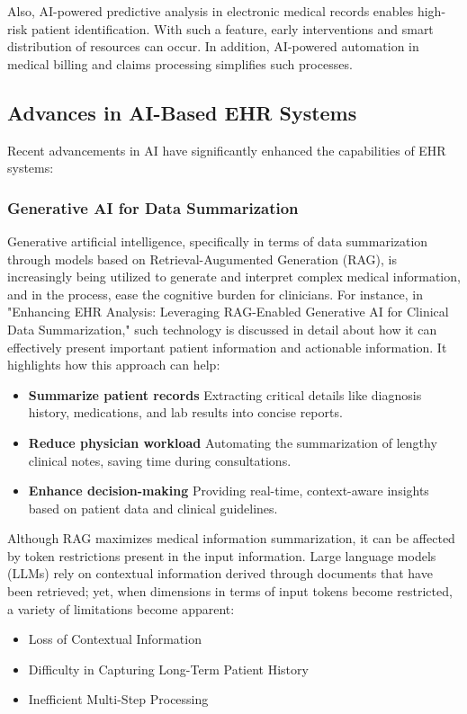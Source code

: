 Also, AI-powered predictive analysis in electronic medical records enables high-risk patient identification. With such a feature, early interventions and smart distribution of resources can occur. In addition, AI-powered automation in medical billing and claims processing simplifies such processes.
\subsection{ Advances in AI-Based EHR Systems}
Recent advancements in AI have significantly enhanced the capabilities of EHR systems:
\subsubsection{Generative AI for Data Summarization}
Generative artificial intelligence, specifically in terms of data summarization through models based on Retrieval-Augumented Generation (RAG), is increasingly being utilized to generate and interpret complex medical information, and in the process, ease the cognitive burden for clinicians. For instance, in "Enhancing EHR Analysis: Leveraging RAG-Enabled Generative AI for Clinical Data Summarization," such technology is discussed in detail about how it can effectively present important patient information and actionable information.\cite{article3} It highlights how this approach can help: 
\begin{itemize}
    \item \textbf{Summarize patient records} Extracting critical details like diagnosis history, medications, and lab results into concise reports.
    \item \textbf{Reduce physician workload} Automating the summarization of lengthy clinical notes, saving time during consultations.
    \item \textbf{Enhance decision-making} Providing real-time, context-aware insights based on patient data and clinical guidelines.
\end{itemize}
Although RAG maximizes medical information summarization, it can be affected by token restrictions present in the input information. Large language models (LLMs) rely on contextual information derived through documents that have been retrieved; yet, when dimensions in terms of input tokens become restricted, a variety of limitations become apparent:
\begin{itemize}
    \item Loss of Contextual Information
    \item Difficulty in Capturing Long-Term Patient History
    \item Inefficient Multi-Step Processing
\end{itemize}
